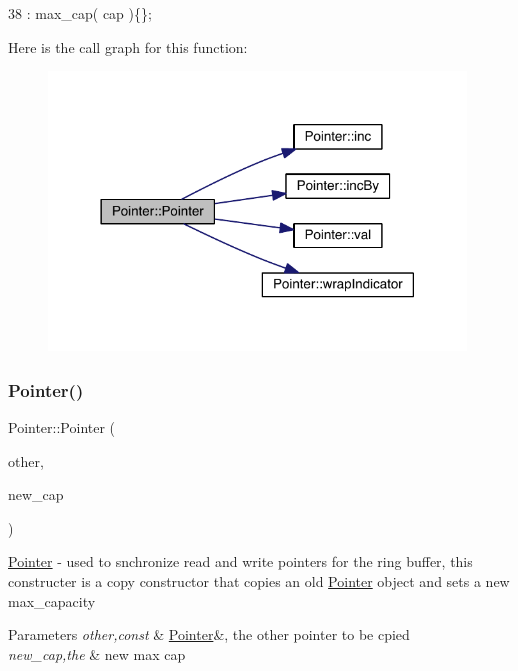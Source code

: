 \begin{DoxyCode}
38 : max\_cap( cap )\{\};
\end{DoxyCode}
Here is the call graph for this function\+:
\nopagebreak
\begin{figure}[H]
\begin{center}
\leavevmode
\includegraphics[width=314pt]{class_pointer_ae124185327ebd4938437141a6aec7ede_cgraph}
\end{center}
\end{figure}
\hypertarget{class_pointer_a94c66784ca4f1f69be6feac9d8ecc7f2}{}\label{class_pointer_a94c66784ca4f1f69be6feac9d8ecc7f2} 
\subsubsection{\texorpdfstring{Pointer()}{Pointer()}\hspace{0.1cm}{\footnotesize\ttfamily [2/2]}}
{\footnotesize\ttfamily Pointer\+::\+Pointer (\begin{DoxyParamCaption}\item[{\hyperlink{class_pointer}{Pointer} $\ast$const}]{other,  }\item[{const std\+::size\+\_\+t}]{new\+\_\+cap }\end{DoxyParamCaption})}

\hyperlink{class_pointer}{Pointer} -\/ used to snchronize read and write pointers for the ring buffer, this constructer is a copy constructor that copies an old \hyperlink{class_pointer}{Pointer} object and sets a new max\+\_\+capacity 
\begin{DoxyParams}{Parameters}
{\em other,const} & \hyperlink{class_pointer}{Pointer}\&, the other pointer to be cpied \\
\hline
{\em new\+\_\+cap,the} & new max cap \\
\hline
\end{DoxyParams}



